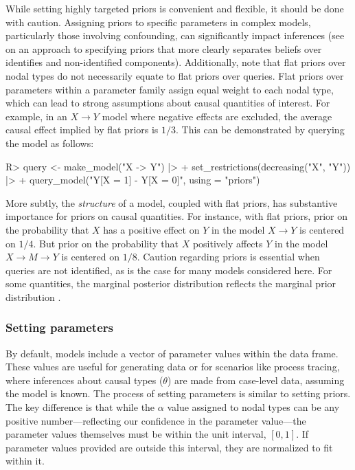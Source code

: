 \documentclass[
  11pt,
  article]{jss}
\renewcommand{\texttt}[1]{\code{#1}}
\begin{document}
While setting highly targeted priors is convenient and flexible, it
should be done with caution. Assigning priors to specific parameters in
complex models, particularly those involving confounding, can
significantly impact inferences (see \citet{richardson2011transparent}
on an approach to specifying priors that more clearly separates beliefs
over identifies and non-identified components). Additionally, note that
flat priors over nodal types do not necessarily equate to flat priors
over queries. Flat priors over parameters within a parameter family
assign equal weight to each nodal type, which can lead to strong
assumptions about causal quantities of interest. For example, in an
\(X \rightarrow Y\) model where negative effects are excluded, the
average causal effect implied by flat priors is \(1/3\). This can be
demonstrated by querying the model as follows:

\begin{CodeInput}
R> query <- make_model("X -> Y") |>
+    set_restrictions(decreasing("X", "Y")) |>
+    query_model("Y[X = 1] - Y[X = 0]", using = "priors")
\end{CodeInput}

More subtly, the \emph{structure} of a model, coupled with flat priors,
has substantive importance for priors on causal quantities. For
instance, with flat priors, prior on the probability that \(X\) has a
positive effect on \(Y\) in the model \(X \rightarrow Y\) is centered on
\(1/4\). But prior on the probability that \(X\) positively affects
\(Y\) in the model \(X \rightarrow M \rightarrow Y\) is centered on
\(1/8\). Caution regarding priors is essential when queries are not
identified, as is the case for many models considered here. For some
quantities, the marginal posterior distribution reflects the marginal
prior distribution \citep{poirier_revising_1998}.

\subsubsection{Setting parameters}\label{parameters}

By default, models include a vector of parameter values within the
\texttt{parameters\_df} data frame. These values are useful for
generating data or for scenarios like process tracing, where inferences
about causal types (\(\theta\)) are made from case-level data, assuming
the model is known. The process of setting parameters is similar to
setting priors. The key difference is that while the \(\alpha\) value
assigned to nodal types can be any positive number---reflecting our
confidence in the parameter value---the parameter values themselves must
be within the unit interval, \([0,1]\). If parameter values provided are
outside this interval, they are normalized to fit within it.
\end{document}
